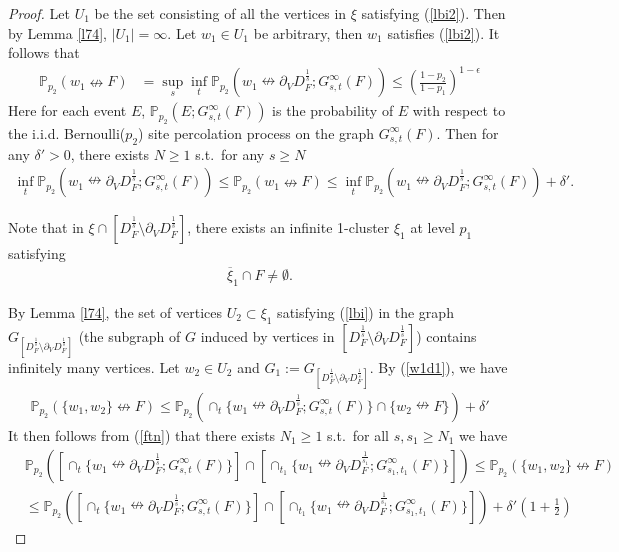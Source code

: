 \documentclass[10pt,a4paper]{amsart}
\newcommand\PP{{\mathbb P}}
\newcommand\ol{\overline}
\begin{document}
\begin{proof}Let $U_1$ be the set consisting of all the vertices in $\xi$ satisfying (\ref{lbi2}). Then by Lemma \ref{l74}, $|U_1|=\infty$. Let $w_1\in U_1$ be arbitrary, then $w_1$ satisfies (\ref{lbi2}). It follows that
\begin{align}
\PP_{p_2}(w_1\nleftrightarrow F)
&=\sup_s\inf_t \PP_{p_2}(w_1\nleftrightarrow \partial_V D_F^{\frac{1}{s}};G_{s,t}^{\infty}(F))\leq \left(\frac{1-p_2}{1-p_1}\right)^{1-\epsilon}\label{ftn}
\end{align}
Here for each event $E$, $\PP_{p_2}(E;G_{s,t}^{\infty}(F))$ is the probability of $E$ with respect to the i.i.d. Bernoulli($p_2$) site percolation process on the graph $G_{s,t}^{\infty}(F)$.
Then for any $\delta'>0$, there exists $N\geq 1$ s.t.~for any $s\geq N$ 
\begin{align}
\inf_t\PP_{p_2}(w_1\nleftrightarrow \partial_V D_F^{\frac{1}{s}};G_{s,t}^{\infty}(F)) \leq\PP_{p_2}(w_1\nleftrightarrow F)\leq \inf_t\PP_{p_2}(w_1\nleftrightarrow \partial_V D_F^{\frac{1}{s}};G_{s,t}^{\infty}(F))+\delta'.\label{w1d1}
\end{align}



Note that in $\xi\cap \left[D_{F}^{\frac{1}{s}}\setminus \partial_V D_{F}^{\frac{1}{s}}\right]$, there exists an infinite 1-cluster $\xi_1$ at level $p_1$ satisfying
\begin{align*}
\ol{\xi}_1\cap F\neq \emptyset.
\end{align*}

By Lemma \ref{l74}, the set of vertices $U_2\subset \xi_1$ satisfying (\ref{lbi}) in the graph $G_{\left[D_{F}^{\frac{1}{s}}\setminus \partial_V D_{F}^{\frac{1}{s}}\right]}$ (the subgraph of $G$ induced by vertices in $\left[D_{F}^{\frac{1}{s}}\setminus \partial_V D_{F}^{\frac{1}{s}}\right]$) contains infinitely many vertices.
Let $w_2\in U_2$ and $G_1:=G_{\left[D_{F}^{\frac{1}{s}}\setminus \partial_V D_{F}^{\frac{1}{s}}\right]}$. By (\ref{w1d1}), we have 
\begin{align*}
\PP_{p_2}(\{w_1,w_2\}\nleftrightarrow F)
\leq \PP_{p_2}(\cap_t\{w_1\nleftrightarrow \partial_V D_F^{\frac{1}{s}};G_{s,t}^{\infty}(F)\}\cap\{w_2\nleftrightarrow  F\})+\delta'
\end{align*}
It then follows from (\ref{ftn}) that there exists $N_1\geq1$ s.t.~for all $s,s_1\geq N_1$ we have
\begin{align*}
&\PP_{p_2}([\cap_t\{w_1\nleftrightarrow \partial_V D_F^{\frac{1}{s}};G_{s,t}^{\infty}(F)\}]\cap[\cap_{t_1}\{w_1\nleftrightarrow \partial_V D_F^{\frac{1}{s_1}};G_{s_1,t_1}^{\infty}(F)\}])
\leq \PP_{p_2}(\{w_1,w_2\}\nleftrightarrow F)
\\&\leq \PP_{p_2}([\cap_t\{w_1\nleftrightarrow \partial_V D_F^{\frac{1}{s}};G_{s,t}^{\infty}(F)\}]\cap[\cap_{t_1}\{w_1\nleftrightarrow \partial_V D_F^{\frac{1}{s_1}};G_{s_1,t_1}^{\infty}(F)\}])+\delta'\left(1+\frac{1}{2}
\right)
\end{align*}


\end{proof}
\end{document}
